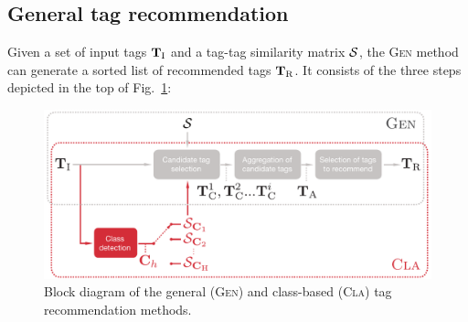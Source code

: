 \subsection{General tag recommendation}
\label{class:sec:Gen}

Given a set of input tags $\mathbf{T}_{\text{I}}$ and a tag-tag similarity matrix $\mathcal{S}$, the \textsc{Gen} method can generate a sorted list of recommended tags $\mathbf{T}_{\text{R}}$. 
It consists of the three steps depicted in the top of Fig.~\ref{class:fig:diagrams}:

\begin{figure}
  \centering
  \includegraphics[width=1.0\columnwidth]{ch04_class/pics/fig_both_diagrams.pdf}
  \caption[Block diagram of the general and class-based tag recommendation methods]{Block diagram of the general (\textsc{Gen}) and class-based (\textsc{Cla}) tag recommendation methods.}
  \label{class:fig:diagrams}
\end{figure}

